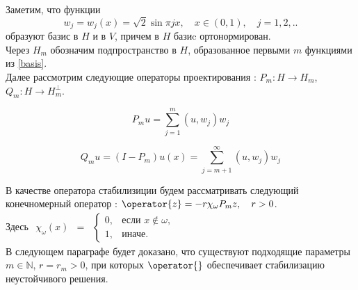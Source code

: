 \vspace{2em}

Заметим, что функции
\begin{equation}\label{basis}
	w_j = w_j(x) = \sqrt{2}\sin{\pi j x}, \quad x \in (0, 1), \quad j=1, 2, ..
\end{equation}
образуют базис в $H$ и в $V$, причем в $H$ базиc ортонормирован.\\
Через $H_m$ обозначим подпространство в $H$, образованное первыми $m$ функциями из \eqref{basis}.\\
Далее рассмотрим следующие операторы проектирования : $P_m : H \rightarrow H_m$, $Q_m : H \rightarrow H_m^{\perp}$.

\begin{equation}
	P_m u = \sum \limits_{j=1}^{m} {(u, w_j) w_j}
\end{equation}

\begin{equation}
	Q_m u = (I - P_m)u(x) = \sum \limits_{j=m + 1}^{\infty} {(u, w_j) w_j}
\end{equation}

В качестве оператора стабилизиции будем рассматривать следующий конечномерный оператор :
$\operator{z} = -r\chi_{\omega}P_mz, \quad r > 0$.\\
Здесь $
    \begin{matrix}
    \chi_{\omega}(x) & =
    & \left\{
    \begin{matrix}
    0, & \mbox{если } x \notin \omega, \\
    1, & \mbox{иначе. }
    \end{matrix} \right.
    \end{matrix}
$\\

В следующем параграфе будет доказано, что существуют подходящие параметры $m \in \mathbb{N}$, $r = r_m > 0$, при которых $\operator{}$ обеспечивает стабилизацию неустойчивого решения.

